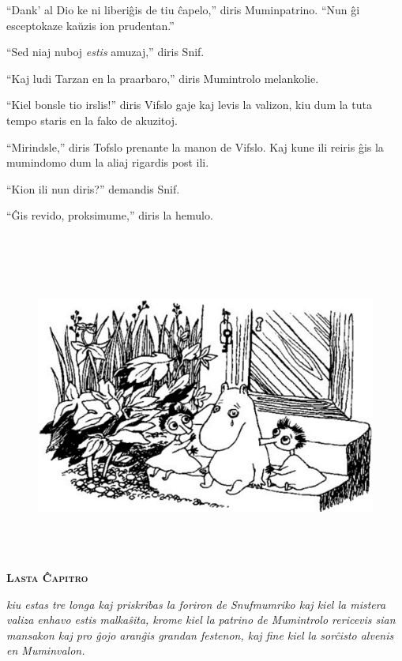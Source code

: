 ``Dank' al Dio ke ni liberiĝis de tiu ĉapelo,'' diris Muminpatrino. ``Nun ĝi esceptokaze kaŭzis ion prudentan.''

``Sed niaj nuboj \emph{estis} amuzaj,'' diris Snif.

``Kaj ludi Tarzan en la praarbaro,'' diris Mumintrolo melankolie.

``Kiel bonsle tio irslis!'' diris Vifslo gaje kaj levis la valizon, kiu dum la tuta tempo staris en la fako de akuzitoj.

``Mirindsle,'' diris Tofslo prenante la manon de Vifslo. Kaj kune ili reiris ĝis la mumindomo dum la aliaj rigardis post ili.

``Kion ili nun diris?'' demandis Snif.

``Ĝis revido, proksimume,'' diris la hemulo.

\chapter[Lasta Ĉapitro]{}


\begin{figure}[htbp]
\centering
\includegraphics[width=450pt,height=286pt]{_32.jpg}
\caption{}
\label{_32}
\end{figure}

\begin{center}\textbf{\Large\color{ForestGreen}\textsc{Lasta Ĉapitro}}\end{center}

\noindent\textit{kiu estas tre longa kaj priskribas la foriron de Snufmumriko kaj kiel la mistera valiza enhavo estis malkaŝita, krome kiel la patrino de Mumintrolo rericevis sian mansakon kaj pro ĝojo aranĝis grandan festenon, kaj fine kiel la sorĉisto alvenis en Muminvalon.}
\hfill \break
\hypertarget{Lasta Ĉapitro}{}
\label{Lasta Ĉapitro}


